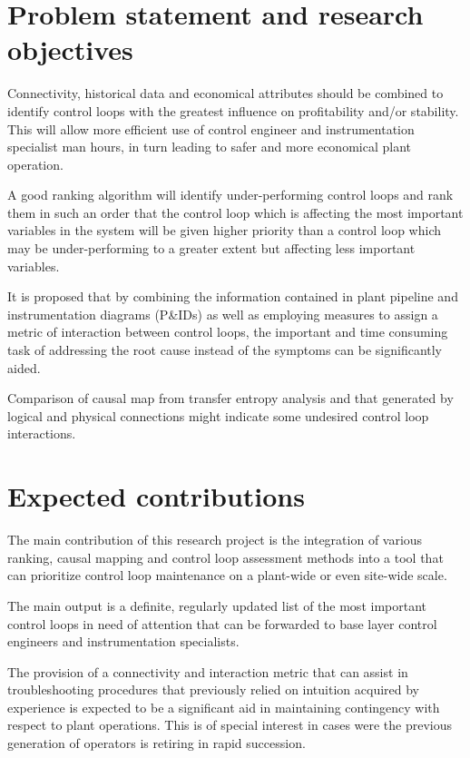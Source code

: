 \documentclass{article}
\begin{document}
\newpage
\section{Problem statement and research objectives}

Connectivity, historical data and economical attributes should be combined to identify control loops with the greatest influence on profitability and/or stability.
This will allow more efficient use of control engineer and instrumentation specialist man hours, in turn leading to safer and more economical plant operation.

A good ranking algorithm will identify under-performing control loops and rank them in such an order that the control loop which is affecting the most important variables in the system will be given higher priority than a control loop which may be under-performing to a greater extent but affecting less important variables.

It is proposed that by combining the information contained in plant pipeline and instrumentation diagrams (P\&IDs) as well as employing measures to assign a metric of interaction between control loops, the important and time consuming task of addressing the root cause instead of the symptoms can be significantly aided.

Comparison of causal map from transfer entropy analysis and that generated by logical and physical connections might indicate some undesired control loop interactions.

\newpage
\section{Expected contributions}

The main contribution of this research project is the integration of various ranking, causal mapping and control loop assessment methods into a tool that can prioritize control loop maintenance on a plant-wide or even site-wide scale.

The main output is a definite, regularly updated list of the most important control loops in need of attention that can be forwarded to base layer control engineers and instrumentation specialists.

The provision of a connectivity and interaction metric that can assist in troubleshooting procedures that previously relied on intuition acquired by experience is expected to be a significant aid in maintaining contingency with respect to plant operations.
This is of special interest in cases were the previous generation of operators is retiring in rapid succession.
\end{document}
